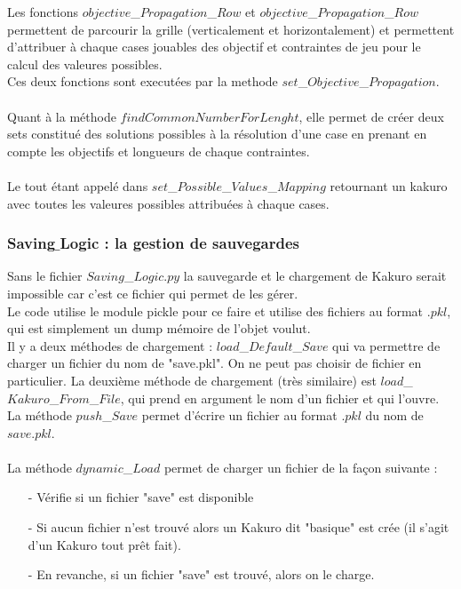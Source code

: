 \documentclass[french,12pt]{article}
\begin{document}
Les fonctions $objective$\_$Propagation$\_$Row$ et $objective$\_$Propagation$\_$Row$ permettent de parcourir la grille (verticalement et horizontalement) et permettent d'attribuer à chaque cases jouables des objectif et contraintes de jeu pour le calcul des valeures possibles. \\
Ces deux fonctions sont executées par la methode $set$\_$Objective$\_$Propagation$. \\ \\
Quant à la méthode $findCommonNumberForLenght$, elle permet de créer deux sets constitué des solutions possibles à la résolution d'une case en prenant en compte les objectifs et longueurs de chaque contraintes. \\ \\ Le tout étant appelé dans $set$\_$Possible$\_$Values$\_$Mapping$ retournant un kakuro avec toutes les valeures possibles attribuées à chaque cases. 

\subsubsection{Saving$\_$Logic : la gestion de sauvegardes}
Sans le fichier $Saving$\_$Logic.py$ la sauvegarde et le chargement de Kakuro serait impossible car c'est ce fichier qui permet de les gérer. \\
Le code utilise le module pickle pour ce faire et utilise des fichiers au format $.pkl$, qui est simplement un dump mémoire de l'objet voulut.  \\
Il y a deux méthodes de chargement : $load$\_$Default$\_$Save$ qui va permettre de charger un fichier du nom de "save.pkl". On ne peut pas choisir de fichier en particulier. La deuxième méthode de chargement (très similaire) est $load$\_$Kakuro$\_$From$\_$File$, qui prend en argument le nom d'un fichier et qui l'ouvre. \\
La méthode $push$\_$Save$ permet d'écrire un fichier au format $.pkl$ du nom de $save.pkl$. \\ \\
La méthode $dynamic$\_$Load$ permet de charger un fichier de la façon suivante : \\
\begin{enumerate}
\item[-] Vérifie si un fichier "save" est disponible\\
\item[-] Si aucun fichier n'est trouvé alors un Kakuro dit "basique" est crée (il s'agit d'un Kakuro tout prêt fait). \\
\item[-] En revanche, si un fichier "save" est trouvé, alors on le charge.\\
\end{enumerate}
\end{document}
